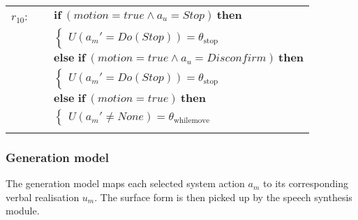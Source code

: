 \begin{footnotesize}
\begin{longtable}{p{2cm}l}
$r_{10}$: \ \ & $ \textbf{if} \ (\mathit{motion}\!=\!\mathit{true} \land \mathit{a_u}\!=\!\mathit{Stop}) \ \textbf{then} $ \\
 & \;\;\;\;\; $ \begin{cases}U(\mathit{a_m}'\!=\!\mathit{Do(Stop)})\!=\!\theta_{\mathrm{stop}} \end{cases}$ \vspace{1mm} \\ & $ \textbf{else if} \ (\mathit{motion}\!=\!\mathit{true} \land \mathit{a_u}\!=\!\mathit{Disconfirm}) \ \textbf{then}$ \\
& \;\;\;\;\; $ \begin{cases}U(\mathit{a_m}'\!=\!\mathit{Do(Stop)})\!=\!\theta_{\mathrm{stop}} \end{cases}$ \vspace{1mm} \\ & $ \textbf{else if} \ (\mathit{motion}\!=\!\mathit{true}) \ \textbf{then}$ \\
& \;\;\;\;\; $ \begin{cases}U(\mathit{a_m}'\!\neq\!\mathit{None})\!=\!\theta_{\mathrm{whilemove}} \end{cases}$ \\ \\[-1mm]
\end{longtable}
\end{footnotesize}

\subsubsection*{Generation model}

The generation model maps each selected system action $a_m$ to its corresponding verbal realisation $u_m$.  The surface form is then picked up by the speech synthesis module.
 
